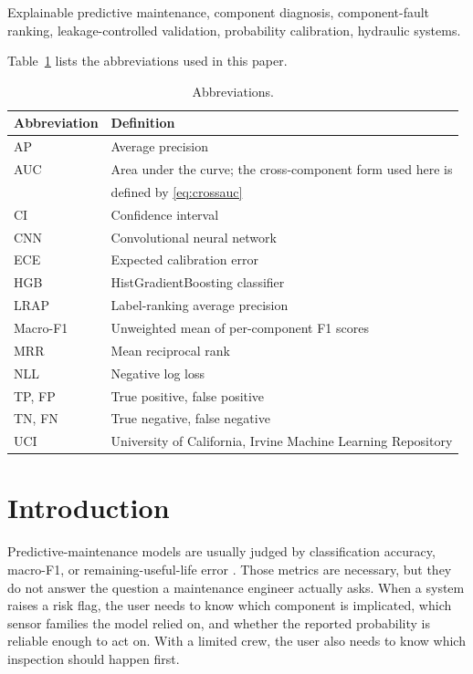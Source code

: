 \documentclass[journal]{IEEEtran}
\begin{document}
\begin{IEEEkeywords}
Explainable predictive maintenance, component diagnosis, component-fault ranking, leakage-controlled validation, probability calibration, hydraulic systems.
\end{IEEEkeywords}

Table~\ref{tab:abbrev} lists the abbreviations used in this paper.

\begin{table}[!b]
\caption{Abbreviations.}
\label{tab:abbrev}
\centering
\footnotesize
\setlength{\tabcolsep}{3pt}
\begin{tabular}{@{}ll@{}}
\toprule
Abbreviation & Definition \\
\midrule
AP & Average precision \\
AUC & Area under the curve; the cross-component form used here is \\
    & defined by \eqref{eq:crossauc} \\
CI & Confidence interval \\
CNN & Convolutional neural network \\
ECE & Expected calibration error \\
HGB & HistGradientBoosting classifier \\
LRAP & Label-ranking average precision \\
Macro-F1 & Unweighted mean of per-component F1 scores \\
MRR & Mean reciprocal rank \\
NLL & Negative log loss \\

TP, FP & True positive, false positive \\
TN, FN & True negative, false negative \\
UCI & University of California, Irvine Machine Learning Repository \\
\bottomrule
\end{tabular}
\end{table}

\section{Introduction}
\label{sec:intro}

Predictive-maintenance models are usually judged by classification accuracy,
macro-F1, or remaining-useful-life error \cite{Carvalho2019SLR,Zonta2020PdMReview}.
Those metrics are necessary, but they do not answer the question a maintenance
engineer actually asks. When a system raises a risk flag, the user needs to know
which component is implicated, which sensor families the model relied on, and whether
the reported probability is reliable enough to act on. With a limited crew, the user
also needs to know which inspection should happen first.
\end{document}
